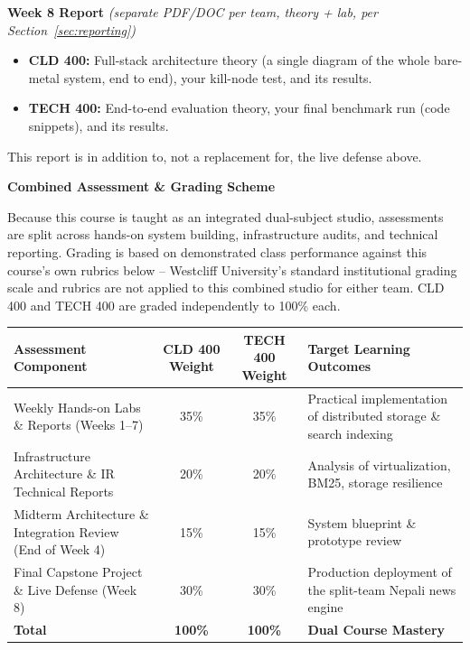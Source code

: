 \documentclass[10pt, a4paper]{article}
\newcommand{\sectionbar}[1]{%
  \par\vspace{0.7em}
  \refstepcounter{section}%
  \noindent\colorbox{secondary}{\parbox{\dimexpr\textwidth-2\fboxsep\relax}{\centering\color{white}\bfseries\Large #1}}%
  \par\vspace{0.5em}
}
\newcommand{\weeklyreport}[3]{%
  \par\vspace{0.4em}
  \noindent\colorbox{lightgray!35}{\parbox{\dimexpr\textwidth-2\fboxsep\relax}{%
    \textbf{\color{primary}#1 Report} \textit{(separate PDF/DOC per team, theory + lab, per Section~\ref{sec:reporting})}
    \begin{itemize}
        \item \textbf{CLD 400:} #2
        \item \textbf{TECH 400:} #3
    \end{itemize}
  }}%
  \par\vspace{0.3em}
}
\begin{document}
\weeklyreport{Week 8}{Full-stack architecture theory (a single diagram of the whole bare-metal system, end to end), your kill-node test, and its results.}{End-to-end evaluation theory, your final benchmark run (code snippets), and its results.} This report is in addition to, not a replacement for, the live defense above.

\vspace{1em}

\sectionbar{Combined Assessment \& Grading Scheme}
\label{sec:grading}
Because this course is taught as an integrated dual-subject studio, assessments are split across hands-on system building, infrastructure audits, and technical reporting. Grading is based on demonstrated class performance against this course's own rubrics below -- Westcliff University's standard institutional grading scale and rubrics are not applied to this combined studio for either team. CLD 400 and TECH 400 are graded independently to 100\% each.

\begin{table}[H]
\centering
\small
\renewcommand{\arraystretch}{1.3}
\begin{tabularx}{\textwidth}{|X|c|c|X|}
\hline
\rowcolor{lightgray}
\textbf{Assessment Component} & \textbf{CLD 400 Weight} & \textbf{TECH 400 Weight} & \textbf{Target Learning Outcomes} \\ \hline
Weekly Hands-on Labs \& Reports (Weeks 1--7) & 35\% & 35\% & Practical implementation of distributed storage \& search indexing \\ \hline
Infrastructure Architecture \& IR Technical Reports & 20\% & 20\% & Analysis of virtualization, BM25, storage resilience \\ \hline
Midterm Architecture \& Integration Review (End of Week 4) & 15\% & 15\% & System blueprint \& prototype review \\ \hline
Final Capstone Project \& Live Defense (Week 8) & 30\% & 30\% & Production deployment of the split-team Nepali news engine \\ \hline
\textbf{Total} & \textbf{100\%} & \textbf{100\%} & \textbf{Dual Course Mastery} \\ \hline
\end{tabularx}
\end{table}
\end{document}
